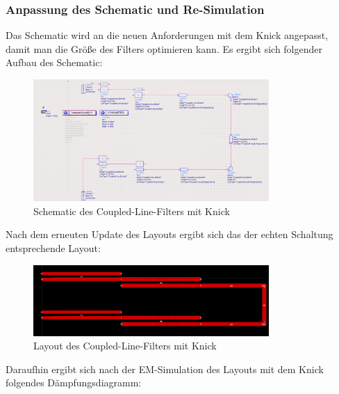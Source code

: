 \subsubsection{Anpassung des Schematic und Re-Simulation}
    Das Schematic wird an die neuen Anforderungen mit dem Knick angepasst, damit man die Größe des Filters optimieren kann. Es ergibt sich folgender Aufbau des Schematic:
    \begin{figure}[H]
        \centering
        \includegraphics[width=0.8\textwidth]{Pictures/SchematicMitKnick.png}
        \caption{Schematic des Coupled-Line-Filters mit Knick}
    \end{figure}
    Nach dem erneuten Update des Layouts ergibt sich das der echten Schaltung entsprechende Layout:
    \begin{figure}[H]
        \centering
        \includegraphics[width=0.8\textwidth]{Pictures/LayoutmitKnick.png}
        \caption{Layout des Coupled-Line-Filters mit Knick}
    \end{figure}
    Daraufhin ergibt sich nach der EM-Simulation des Layouts mit dem Knick folgendes Dämpfungsdiagramm:

